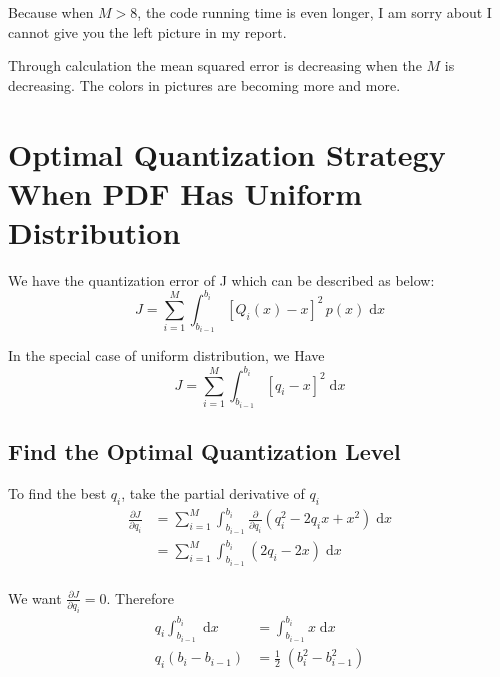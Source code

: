 \documentclass{article}
\begin{document}
Because when $M > 8$, the code running time is even longer, I am sorry about I cannot give you the left picture in my report.

Through calculation the mean squared error is decreasing when the $M$ is decreasing. The colors in pictures are becoming more and more.

\section{Optimal Quantization Strategy When PDF Has Uniform Distribution}
We have the quantization error of J which can be described as below:
\begin{equation}
J = \sum_{i = 1}^{M}  \int_{b_{i - 1}}^{b_i} [Q_i(x) - x]^2 \, p(x) \; \mathrm{d}x
\end{equation}

In the special case of uniform distribution, we Have
\begin{equation}
J = \sum_{i = 1}^{M}  \int_{b_{i - 1}}^{b_i} [q_i - x]^2 \; \mathrm{d}x
\label{eq:label}
\end{equation}

\subsection{Find the Optimal Quantization Level}

To find the best $q_i$, take the partial derivative of $q_i$
\begin{equation*}
	\begin{aligned}
		\frac{\partial J}{\partial q_i} &= \sum_{i = 1}^{M} \int_{b_{i - 1}}^{b_i} \frac{\partial}{\partial q_i} (q_i^2 - 2q_ix + x^2) \; \mathrm{d}x \\
		&= \sum_{i = 1}^{M} \int_{b_{i - 1}}^{b_i} (2 q_i - 2x) \; \mathrm{d}x \\ 
	\end{aligned}
\end{equation*}

We want $\frac{\partial J}{\partial q_i} = 0$. Therefore \\ 
\begin{equation*}
	\begin{aligned}
		 q_i \int_{b_{i - 1}}^{b_i} \; \mathrm{d}x &=  \int_{b_{i - 1}}^{b_i} x \; \mathrm{d}x \\ 
		 q_i (b_i - b_{i - 1}) &= \frac12 \;  (b_i^2 - b_{i - 1}^2) 	 
	\end{aligned}
\end{equation*}
\end{document}
